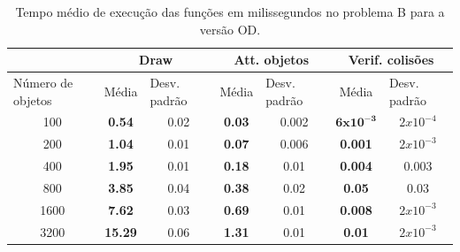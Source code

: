 \begin{table}[h!]
\centering
\caption{Tempo médio de execução das funções em milissegundos no problema B para a versão OD.}
\label{dodv2table}
\begin{tabular}{c|cc|cc|cc}
\cline{2-7}
                                       & \multicolumn{2}{c|}{Draw}                                     & \multicolumn{2}{c|}{Att. objetos}                              & \multicolumn{2}{c}{Verif. colisões}                \\ \hline
\multicolumn{1}{l|}{Número de objetos} & \multicolumn{1}{l}{Média} & \multicolumn{1}{l|}{Desv. padrão} & \multicolumn{1}{l}{Média} & \multicolumn{1}{l|}{Desv. padrão} & Média           & \multicolumn{1}{l}{Desv. padrão} \\ \hline
100                                     & \textbf{0.54}              & 0.02                              &\textbf{0.03}                      & 0.002                      &$\bm{6 x 10^{-3}}$      & $2 x 10^{-4}$                     \\ \hline
200                                     & \textbf{1.04}              & 0.01                              &\textbf{0.07}                      & 0.006                      &\textbf{0.001}          & $2 x 10^{-3}$                     \\ \hline
400                                     & \textbf{1.95}              & 0.01                              &\textbf{0.18}                      & 0.01                       &\textbf{0.004}          & 0.003                             \\ \hline
800                                     & \textbf{3.85}              & 0.04                              &\textbf{0.38}                      & 0.02                       &\textbf{0.05}           & 0.03                              \\ \hline
1600                                    & \textbf{7.62}              & 0.03                              &\textbf{0.69}                      & 0.01                       &\textbf{0.008}          & $2 x 10^{-3}$                     \\ \hline
3200                                    & \textbf{15.29}             & 0.06                              &\textbf{1.31}                      & 0.01                       &\textbf{0.01}           & $2 x 10^{-3}$                     \\ \hline
\end{tabular}
\end{table}

